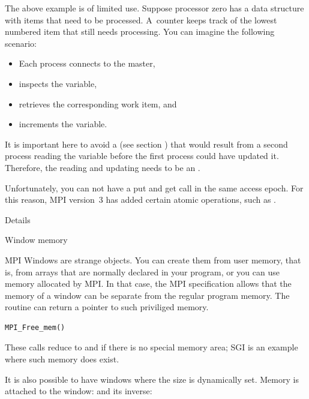The above example is of limited use.
Suppose processor zero has a data structure 
with items that need to be processed. A~counter 
keeps track of the lowest numbered item that still needs processing.
You can imagine the following
 scenario:
\begin{itemize}
\item Each process connects to the master,
\item inspects the  variable,
\item retrieves the corresponding work item, and
\item increments the  variable.
\end{itemize}
It is important here to avoid a 
(see section ) that would result
from a second process reading the  variable 
before the first process could have updated it. Therefore, the reading
and updating needs to be an .

Unfortunately, you can not have a put and get call in the same access
epoch. For this reason, MPI version~3 has added certain atomic
operations, such as .

 {Details}

 {Window memory}
\label{sec:mpi-alloc}

MPI Windows are strange objects. You can create them from user memory,
that is, from arrays that are normally declared in your program, or
you can use memory allocated by  MPI. In that case,
the MPI specification allows that the memory of a window can be 
separate from the regular program memory. The routine 
can return a pointer to such priviliged memory.



\begin{verbatim}
MPI_Free_mem()
\end{verbatim}
These calls reduce to  and  if there is no special
memory area; SGI is an example where such memory does exist.

It is also possible to have windows where the size is dynamically set.
%
%
Memory is attached to the window:
%
%
and its inverse:
%

